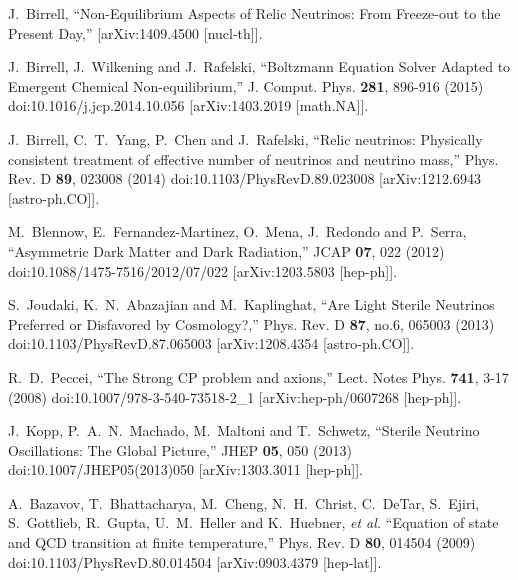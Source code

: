 \documentclass[universe,article,submit,moreauthors,pdftex,a4paper]{Definitions/mdpi}
\begin{document}
\begin{thebibliography}{99}
J.~Birrell,
``Non-Equilibrium Aspects of Relic Neutrinos: From Freeze-out to the Present Day,''
[arXiv:1409.4500 [nucl-th]].

J.~Birrell, J.~Wilkening and J.~Rafelski,
``Boltzmann Equation Solver Adapted to Emergent Chemical Non-equilibrium,''
J. Comput. Phys. \textbf{281}, 896-916 (2015)
doi:10.1016/j.jcp.2014.10.056
[arXiv:1403.2019 [math.NA]].

J.~Birrell, C.~T.~Yang, P.~Chen and J.~Rafelski,
``Relic neutrinos: Physically consistent treatment of effective number of neutrinos and neutrino mass,''
Phys. Rev. D \textbf{89}, 023008 (2014)
doi:10.1103/PhysRevD.89.023008
[arXiv:1212.6943 [astro-ph.CO]].

M.~Blennow, E.~Fernandez-Martinez, O.~Mena, J.~Redondo and P.~Serra,
``Asymmetric Dark Matter and Dark Radiation,''
JCAP \textbf{07}, 022 (2012)
doi:10.1088/1475-7516/2012/07/022
[arXiv:1203.5803 [hep-ph]].

S.~Joudaki, K.~N.~Abazajian and M.~Kaplinghat,
``Are Light Sterile Neutrinos Preferred or Disfavored by Cosmology?,''
Phys. Rev. D \textbf{87}, no.6, 065003 (2013)
doi:10.1103/PhysRevD.87.065003
[arXiv:1208.4354 [astro-ph.CO]].

R.~D.~Peccei,
``The Strong CP problem and axions,''
Lect. Notes Phys. \textbf{741}, 3-17 (2008)
doi:10.1007/978-3-540-73518-2\_1
[arXiv:hep-ph/0607268 [hep-ph]].

J.~Kopp, P.~A.~N.~Machado, M.~Maltoni and T.~Schwetz,
``Sterile Neutrino Oscillations: The Global Picture,''
JHEP \textbf{05}, 050 (2013)
doi:10.1007/JHEP05(2013)050
[arXiv:1303.3011 [hep-ph]].

A.~Bazavov, T.~Bhattacharya, M.~Cheng, N.~H.~Christ, C.~DeTar, S.~Ejiri, S.~Gottlieb, R.~Gupta, U.~M.~Heller and K.~Huebner, \textit{et al.}
``Equation of state and QCD transition at finite temperature,''
Phys. Rev. D \textbf{80}, 014504 (2009)
doi:10.1103/PhysRevD.80.014504
[arXiv:0903.4379 [hep-lat]].


\end{thebibliography}
\end{document}
